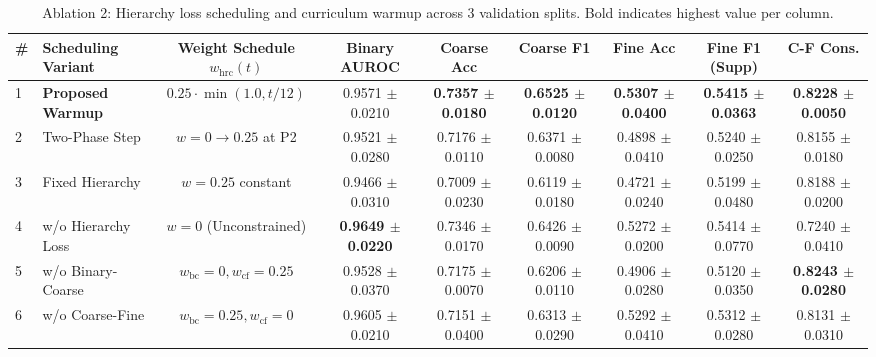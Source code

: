 \documentclass[runningheads]{llncs}
\begin{document}
\begin{table}[t]
\centering
\caption{Ablation 2: Hierarchy loss scheduling and curriculum warmup across 3 validation splits. Bold indicates highest value per column.}
\label{tab:ablation_hierarchy_schedule}
\begin{adjustbox}{max width=\textwidth}
\begin{tabular}{llccccccc}
\toprule
\textbf{\#} & \textbf{Scheduling Variant} & \textbf{Weight Schedule $w_{\text{hrc}}(t)$} & \textbf{Binary AUROC} & \textbf{Coarse Acc} & \textbf{Coarse F1} & \textbf{Fine Acc} & \textbf{Fine F1 (Supp)} & \textbf{C-F Cons.} \\
\midrule
1 & \textbf{Proposed Warmup} & $0.25 \cdot \min(1.0, t/12)$ & 0.9571 $\pm$ 0.0210 & \textbf{0.7357 $\pm$ 0.0180} & \textbf{0.6525 $\pm$ 0.0120} & \textbf{0.5307 $\pm$ 0.0400} & \textbf{0.5415 $\pm$ 0.0363} & \textbf{0.8228 $\pm$ 0.0050} \\
2 & Two-Phase Step & $w=0 \to 0.25$ at P2 & 0.9521 $\pm$ 0.0280 & 0.7176 $\pm$ 0.0110 & 0.6371 $\pm$ 0.0080 & 0.4898 $\pm$ 0.0410 & 0.5240 $\pm$ 0.0250 & 0.8155 $\pm$ 0.0180 \\
3 & Fixed Hierarchy & $w=0.25$ constant & 0.9466 $\pm$ 0.0310 & 0.7009 $\pm$ 0.0230 & 0.6119 $\pm$ 0.0180 & 0.4721 $\pm$ 0.0240 & 0.5199 $\pm$ 0.0480 & 0.8188 $\pm$ 0.0200 \\
4 & w/o Hierarchy Loss & $w=0$ (Unconstrained) & \textbf{0.9649 $\pm$ 0.0220} & 0.7346 $\pm$ 0.0170 & 0.6426 $\pm$ 0.0090 & 0.5272 $\pm$ 0.0200 & 0.5414 $\pm$ 0.0770 & 0.7240 $\pm$ 0.0410 \\
5 & w/o Binary-Coarse & $w_{\text{bc}}=0, w_{\text{cf}}=0.25$ & 0.9528 $\pm$ 0.0370 & 0.7175 $\pm$ 0.0070 & 0.6206 $\pm$ 0.0110 & 0.4906 $\pm$ 0.0280 & 0.5120 $\pm$ 0.0350 & \textbf{0.8243 $\pm$ 0.0280} \\
6 & w/o Coarse-Fine & $w_{\text{bc}}=0.25, w_{\text{cf}}=0$ & 0.9605 $\pm$ 0.0210 & 0.7151 $\pm$ 0.0400 & 0.6313 $\pm$ 0.0290 & 0.5292 $\pm$ 0.0410 & 0.5312 $\pm$ 0.0280 & 0.8131 $\pm$ 0.0310 \\
\bottomrule
\end{tabular}
\end{adjustbox}
\end{table}
\end{document}
